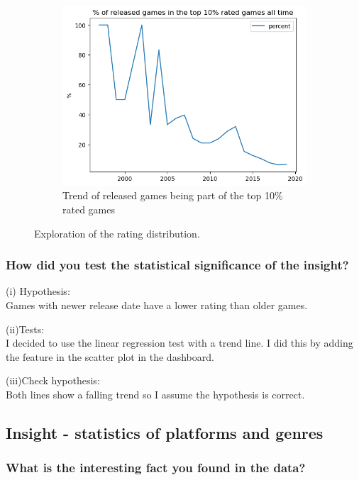 \documentclass[11pt]{article}
\begin{document}
\begin{figure}
\begin{subfigure}[b]{0.475\textwidth}
        \centering
        \includegraphics[width=1\textwidth]{graphics/insight2_graph3.png}
        \caption{Trend of released games being part of the top 10\% rated games}
        \label{fig:insight2_3}
    \end{subfigure}
    \label{fig:insight2}
    \caption{Exploration of the rating distribution.}
\end{figure}

\subsubsection{How did you test the statistical significance of the insight?}

(i) Hypothesis:\\
Games with newer release date have a lower rating than older games.

(ii)Tests:\\
I decided to use the linear regression test with a trend line. I did this by adding the feature in the scatter plot in the dashboard. 

(iii)Check hypothesis:\\
Both lines show a falling trend so I assume the hypothesis is correct.

\subsection{Insight - statistics of platforms and genres}

\subsubsection{What is the interesting fact you found in the data?}
\end{document}
